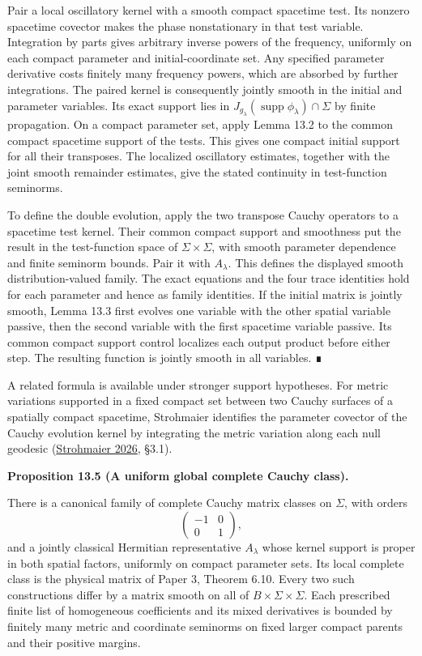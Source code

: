 \documentclass[
  english,
  11pt,
  reqno]{amsart}
\makeatletter
\newcommand{\pandocstatementheading}[1]{%
  \par\if@nobreak\else
    \addpenalty{\@beginparpenalty}%
    \addvspace{.5\baselineskip plus .2\baselineskip minus .2\baselineskip}%
  \fi
  {\normalfont\bfseries #1\par}%
  \nobreak\@afterindenttrue\@afterheading
}
\newcommand{\paperblockheading}[2][.45\baselineskip]{%
  \par\Needspace{6\baselineskip}%
  \addvspace{\baselineskip}%
  \noindent{\normalfont\bfseries #2}\par\nobreak
  \vskip#1\relax\nobreak
}
\makeatother
\begin{document}
Pair a local oscillatory kernel with a smooth compact spacetime test.
Its nonzero spacetime covector makes the phase nonstationary in that
test variable. Integration by parts gives arbitrary inverse powers of
the frequency, uniformly on each compact parameter and
initial-coordinate set. Any specified parameter derivative costs
finitely many frequency powers, which are absorbed by further
integrations. The paired kernel is consequently jointly smooth in the
initial and parameter variables. Its exact support lies in
\(J_{g_\lambda}(\operatorname{supp}\phi_\lambda)\cap\Sigma\) by finite
propagation. On a compact parameter set, apply Lemma 13.2 to the common
compact spacetime support of the tests. This gives one compact initial
support for all their transposes. The localized oscillatory estimates,
together with the joint smooth remainder estimates, give the stated
continuity in test-function seminorms.

To define the double evolution, apply the two transpose Cauchy operators
to a spacetime test kernel. Their common compact support and smoothness
put the result in the test-function space of \(\Sigma\times\Sigma\),
with smooth parameter dependence and finite seminorm bounds. Pair it
with \(A_\lambda\). This defines the displayed smooth
distribution-valued family. The exact equations and the four trace
identities hold for each parameter and hence as family identities. If
the initial matrix is jointly smooth, Lemma 13.3 first evolves one
variable with the other spatial variable passive, then the second
variable with the first spacetime variable passive. Its common compact
support control localizes each output product before either step. The
resulting function is jointly smooth in all variables. ∎

A related formula is available under stronger support hypotheses. For
metric variations supported in a fixed compact set between two Cauchy
surfaces of a spatially compact spacetime, Strohmaier identifies the
parameter covector of the Cauchy evolution kernel by integrating the
metric variation along each null geodesic
(\hyperref[ref-Strohmaier2026]{Strohmaier 2026}, §3.1).

\paperblockheading[0pt]{The joint Cauchy and wave classes.}

\pandocstatementheading{\protect{}\label{prop:family-global-cauchy-class}Proposition 13.5 (A uniform global complete Cauchy class).}

There is a canonical family of complete Cauchy matrix classes on
\(\Sigma\), with orders \[
\begin{pmatrix}-1&0\\0&1\end{pmatrix},
\] and a jointly classical Hermitian representative \(A_\lambda\) whose
kernel support is proper in both spatial factors, uniformly on compact
parameter sets. Its local complete class is the physical matrix of Paper
3, Theorem 6.10. Every two such constructions differ by a matrix smooth
on all of \(B\times\Sigma\times\Sigma\). Each prescribed finite list of
homogeneous coefficients and its mixed derivatives is bounded by
finitely many metric and coordinate seminorms on fixed larger compact
parents and their positive margins.
\end{document}
